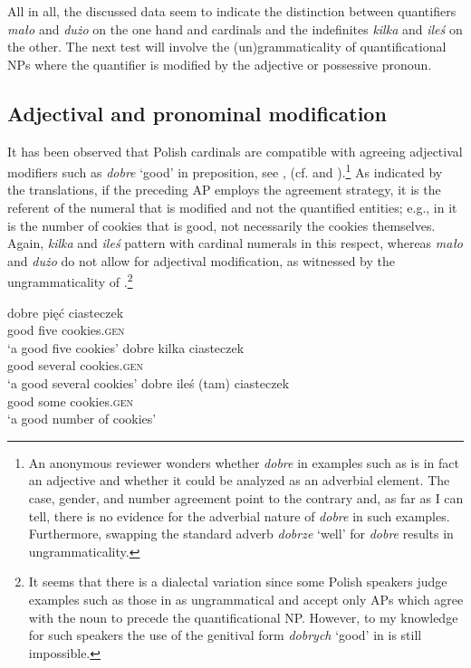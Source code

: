 \documentclass[output=paper,
]{langscibook}
\begin{document}
\noindent	All in all, the discussed data seem to indicate the distinction between quantifiers \textit{mało} and \textit{dużo} on the one hand and cardinals and the indefinites \textit{kilka} and \textit{ileś} on the other. The next test will involve the (un)grammaticality of quantificational NPs where the quantifier is modified by the adjective or possessive pronoun.
	
	\subsection{Adjectival and pronominal modification}\label{sec:adjectival-and pronominal-modification}
	
	It has been observed that Polish cardinals are compatible with agreeing adjectival modifiers such as \textit{dobre} `good' in preposition, see , (cf. \citealt{babby1987case} and \citealt{miechowicz-mathiasen2011syntax}).\footnote{An anonymous reviewer wonders whether \textit{dobre} in examples such as  is in fact an adjective and whether it could be analyzed as an adverbial element. The case, gender, and number agreement point to the contrary and, as far as I can tell, there is no evidence for the adverbial nature of \textit{dobre} in such examples. Furthermore, swapping the standard adverb \textit{dobrze} `well' for \textit{dobre} results in ungrammaticality.} As indicated by the translations, if the preceding AP employs the agreement strategy, it is the referent of the numeral that is modified and not the quantified entities; e.g., in  it is the number of cookies that is good, not necessarily the cookies themselves. Again, \textit{kilka} and \textit{ileś} pattern with cardinal numerals in this respect, whereas \textit{mało} and \textit{dużo} do not allow for adjectival modification, as witnessed by the ungrammaticality of .\footnote{It seems that there is a dialectal variation since some Polish speakers judge examples such as those in  as ungrammatical and accept only APs which agree with the noun to precede the quantificational NP. However, to my knowledge for such speakers the use of the genitival form \textit{dobrych} `good' in  is still impossible.}
	
	\ea \label{ex:adjectival-modifiers-agreement} \ea \gll dobre pięć ciasteczek\label{ex:adjectival-modifiers-agreement-cardinals}\\
	good five cookies.\textsc{gen}\\
	\glt `a good five cookies'
	\ex \gll dobre kilka ciasteczek\\
	good several cookies.\textsc{gen}\\
	\glt `a good several cookies'
	\ex \gll dobre {ileś (tam)} ciasteczek\\
	good some cookies.\textsc{gen}\\
	\glt `a good number of cookies'  
	\z
    \z
\end{document}
